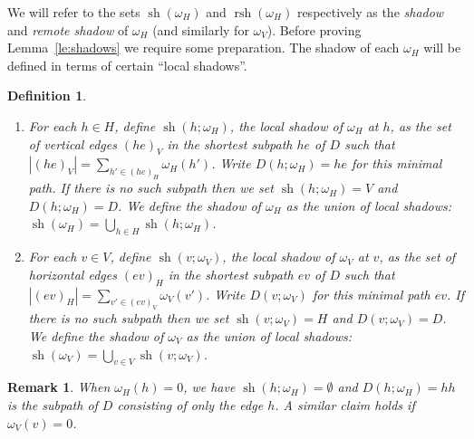 \documentclass{amsart}
\newtheorem{definition}[theorem]{Definition}
\newtheorem{remark}[theorem]{Remark}
\newcommand{\rsh}{\operatorname{rsh}}
\newcommand{\sh}{\operatorname{sh}}
\newenvironment{enumeratea}{\begin{enumerate}[\upshape (a)]}
                           {\end{enumerate}}
\begin{document}
 We will refer to the sets $\sh(\omega_H)$ and $\rsh(\omega_H)$ respectively as the \emph{shadow} and \emph{remote shadow} of $\omega_H$ (and similarly for $\omega_V$).  Before proving Lemma~\ref{le:shadows} we require some preparation.  The shadow of each $\omega_H$ will be defined in terms of certain ``local shadows''.
 \begin{definition}\label{def:local}\mbox{}
  \begin{enumeratea}
   \item For each $h\in H$, define $\sh(h;\omega_H)$, the \emph{local shadow of $\omega_H$ at $h$}, as the set of vertical edges $(he)_V$ in the shortest subpath $he$ of $D$ such that $|(he)_V|=\sum\limits_{h'\in(he)_H}\omega_H(h')$.  Write $D(h;\omega_H)=he$ for this minimal path.  If there is no such subpath then we set $\sh(h;\omega_H)=V$ and $D(h;\omega_H)=D$.  We define the \emph{shadow} of $\omega_H$ as the union of local shadows: $\sh(\omega_H)=\bigcup\limits_{h\in H}\sh(h;\omega_H)$.
   \item For each $v\in V$, define $\sh(v;\omega_V)$, the \emph{local shadow of $\omega_V$ at $v$}, as the set of horizontal edges $(ev)_H$ in the shortest subpath $ev$ of $D$ such that $|(ev)_H|=\sum\limits_{v'\in(ev)_V}\omega_V(v')$.  Write $D(v;\omega_V)$ for this minimal path $ev$.  If there is no such subpath then we set $\sh(v;\omega_V)=H$ and $D(v;\omega_V)=D$.  We define the \emph{shadow} of $\omega_V$ as the union of local shadows: $\sh(\omega_V)=\bigcup\limits_{v\in V}\sh(v;\omega_V)$.
  \end{enumeratea}
 \end{definition}
 \begin{remark}
  When $\omega_H(h)=0$, we have $\sh(h;\omega_H)=\emptyset$ and $D(h;\omega_H)=hh$ is the subpath of $D$ consisting of only the edge $h$.  A similar claim holds if $\omega_V(v)=0$.
 \end{remark}
\end{document}
